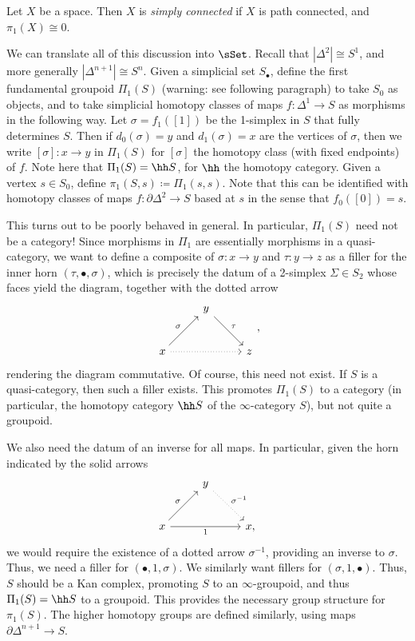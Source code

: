 \begin{definition}\label{dfn:1-1-10}
	Let $X$ be a space. Then $X$ is \emph{simply connected} if $X$ is path connected, and $\pi _1(X)\cong 0$.
\end{definition}

\begin{discussion}\label{disc:1-1-11}
	We can translate all of this discussion into $\sSet $. Recall that $\left| \Delta ^2 \right| \cong S^1$, and more generally $\left| \Delta ^{n+1}  \right| \cong S^n$. Given a simplicial set $S_{\bullet} $, define the first fundamental groupoid $\Pi _1(S)$ (warning: see following paragraph) to take $S_0$ as objects, and to take simplicial homotopy classes of maps $f : \Delta ^1 \to S$ as morphisms in the following way. Let $\sigma =f_1([1])$ be the 1-simplex in $S$ that fully determines $S$. Then if $d_0(\sigma ) = y$ and $d_1(\sigma )=x$ are the vertices of $\sigma $, then we write $[\sigma] : x \to y$ in $\Pi _1(S)$ for $[\sigma ]$ the homotopy class (with fixed endpoints) of $f$. Note here that $\Pi _1(S) = \hh S$, for $\hh $ the homotopy category. Given a vertex $s\in S_0$, define $\pi _1(S,s) \coloneqq \Pi_1(s,s)$. Note that this can be identified with homotopy classes of maps $f : \partial \Delta ^2 \to S$ based at $s$ in the sense that $f_0([0]) = s$.
 
	This turns out to be poorly behaved in general. In particular, $\Pi _1(S)$ need not be a category! Since morphisms in $\Pi _1$ are essentially morphisms in a quasi-category, we want to define a composite of $\sigma : x \to y$ and $\tau : y \to z$ as a filler for the inner horn $(\tau ,\bullet, \sigma )$, which is precisely the datum of a 2-simplex $\Sigma \in S_2$ whose faces yield the diagram, together with the dotted arrow
	\[
		\begin{tikzcd}[row sep = 2.5em, column sep = 2.5em]
		 & y \ar[" \tau  ", dr]  &  \\
		x \ar[" \sigma  ", ur] \ar[dotted, rr]  &  & z
	\end{tikzcd},
	\]
	rendering the diagram commutative. Of course, this need not exist. If $S$ is a quasi-category, then such a filler exists. This promotes $\Pi _1(S)$ to a category (in particular, the homotopy category $\hh S$ of the $\infty $-category $S$), but not quite a groupoid.

	We also need the datum of an inverse for all maps. In particular, given the horn indicated by the solid arrows
	\[
		\begin{tikzcd}[row sep = 2.5em, column sep = 2.5em]
		 & y \ar[" \sigma ^{-1}  ", dotted, dr]  &  \\
		x \ar[" \sigma  ", ur] \ar[" 1 "', rr]  &  & x,
	\end{tikzcd}
	\]
	we would require the existence of a dotted arrow $\sigma ^{-1} $, providing an inverse to $\sigma $. Thus, we need a filler for $(\bullet, 1, \sigma )$. We similarly want fillers for $(\sigma ,1,\bullet)$. Thus, $S$ should be a Kan complex, promoting $S$ to an $\infty $-groupoid, and thus $\Pi _1(S) = \hh S$ to a groupoid. This provides the necessary group structure for $\pi _1(S)$. The higher homotopy groups are defined similarly, using maps $\partial \Delta ^{n+1} \to S$.
\end{discussion}

